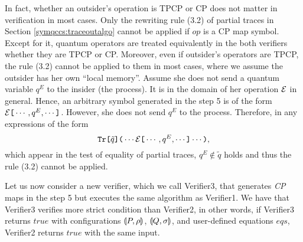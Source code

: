 In fact, whether an outsider's operation is TPCP or CP
does not matter in verification in most cases.
Only the rewriting rule (3.2) of
partial traces in Section \ref{symqccs:traceoutalgo} cannot
be applied if $\mathit{op}$ is a CP map symbol. Except for
it, quantum operators are treated equivalently in the both verifiers
whether they are TPCP or CP.
Moreover, even if outsider's operators are TPCP,
the rule (3.2) cannot be applied to them
in most cases, where we assume the outsider has her own
``local memory''.
Assume she does not send a quantum variable $q^E$
to the insider (the process).
It is in the domain of her operation $\mathcal{E}$ in general.
Hence, an arbitrary symbol generated in the step 5 is of the form 
$\mathcal{E}\texttt{[}\cdots, q^E, \cdots\texttt{]}$.
However, she does not send $q^E$ to the process.
Therefore, in any expressions of the 
form 
\[
 \texttt{Tr[}\tilde q\texttt{](}\cdots\mathcal{E}\texttt{[}\cdots, q^E, \cdots\texttt{]}
 \cdots\texttt{)},
\]
which appear in the test of equality of partial traces, 
$q^E \notin \tilde q$ holds and thus the rule (3.2) cannot be applied.

Let us now consider a new verifier, which we call Verifier3,
that generates {\it CP} maps in the 
step 5 but executes the same algorithm as Verifier1.
We have that Verifier3 verifies more strict condition
than Verifier2, in other words, if Verifier3 returns 
$\mathit{true}$ with configurations $\llparenthesis P, \rho \rrparenthesis$, $\llparenthesis Q, \sigma \rrparenthesis$,
and user-defined equations $\mathit{eqs}$, Verifier2
returns $\mathit{true}$ with the same input.
